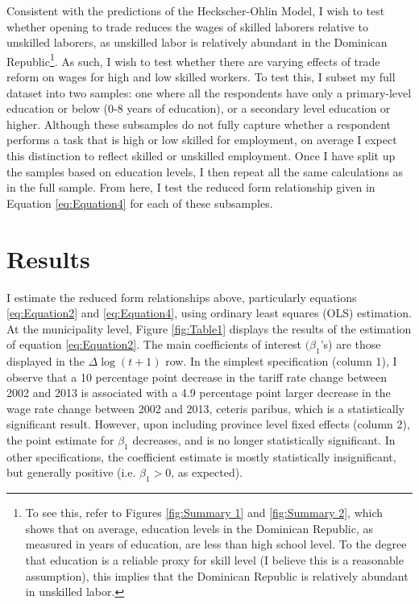 \documentclass[12pt]{article}
\begin{document}
Consistent with the predictions of the Heckscher-Ohlin Model, I wish to test whether opening to
trade reduces the wages of skilled laborers relative to unskilled laborers, as unskilled labor
is relatively abundant in the Dominican Republic\footnote{To see this, refer to Figures \ref{fig:Summary 1}
and \ref{fig:Summary 2}, which shows that on average, education levels in the Dominican Republic,
as measured in years of education, are less than high school level. To the degree that education
is a reliable proxy for skill level (I believe this is a reasonable assumption), this implies that 
the Dominican Republic is relatively abundant in unskilled labor.}. 
As such, I wish to test whether there are varying effects of trade reform on wages for high and 
low skilled workers. To test this, I subset my full dataset into two samples: one where all
the respondents have only a primary-level education or below (0-8 years of education), or
a secondary level education or higher. Although these subsamples do not fully capture whether a respondent
performs a task that is high or low skilled for employment, on average I expect this distinction to
reflect skilled or unskilled employment. Once I have split up the samples based on education levels,
I then repeat all the same calculations as in the full sample. From here, I test the reduced form 
relationship given in Equation \ref{eq:Equation4} for each of these subsamples. 

\vspace{-10pt}
\section{Results}
\label{sec:Results}
I estimate the reduced form relationships above, particularly equations \ref{eq:Equation2}
and \ref{eq:Equation4}, using ordinary least squares (OLS) estimation.  At the municipality
level, Figure \ref{fig:Table1} displays the results of the estimation of equation \ref{eq:Equation2}. 
The main coefficients of interest $(\beta_1$'s) are those displayed in the $\Delta\log(t+1)$ row. In the simplest
specification (column 1), I observe that a 10 percentage point decrease in the tariff rate change between
2002 and 2013 is associated with a 4.9 percentage point larger decrease in the wage rate change between 
2002 and 2013, ceteris paribus, which is a statistically significant result. However, upon including 
province level fixed effects (column 2), the point estimate for $\beta_1$ decreases, and is no longer 
statistically significant. In other specifications, the coefficient estimate is mostly statistically 
insignificant, but generally positive (i.e. $\beta_1 > 0$, as expected). 
\end{document}
